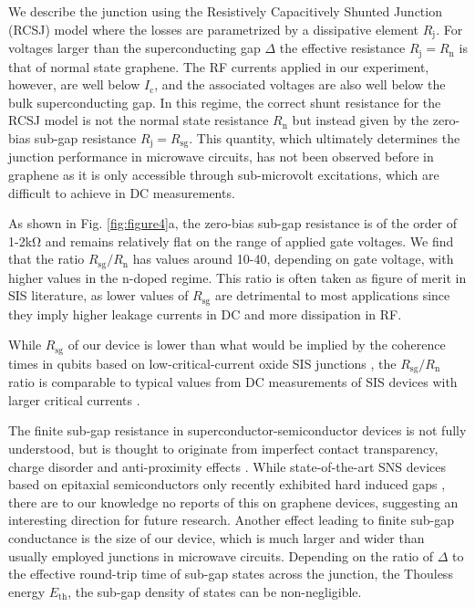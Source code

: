We describe the junction using the Resistively Capacitively Shunted Junction (RCSJ) model where the losses are parametrized by a dissipative element $R_\text{j}$.
For voltages larger than the superconducting gap $\Delta$ the effective resistance $R_\text{j} = R_\text{n}$ is that of normal state graphene.
The RF currents applied in our experiment, however, are well below $I_\text{c}$, and the associated voltages are also well below the bulk superconducting gap.
In this regime, the correct shunt resistance for the RCSJ model is not the normal state resistance $R_\text{n}$ but instead given by the zero-bias sub-gap resistance $R_\text{j} = R_\text{sg}$.
This quantity, which ultimately determines the junction performance in microwave circuits, has not been observed before in graphene as it is only accessible through sub-microvolt excitations, which are difficult to achieve in DC measurements.

As shown in Fig. \ref{fig:figure4}a, the zero-bias sub-gap resistance is of the order of 1-2\si{\kilo\ohm} and remains relatively flat on the range of applied gate voltages.
We find that the ratio $R_\text{sg}/R_\text{n}$ has values around 10-40, depending on gate voltage, with higher values in the n-doped regime.
This ratio is often taken as figure of merit in SIS literature, as lower values of $R_\text{sg}$ are detrimental to most applications since they imply higher leakage currents in DC and more dissipation in RF.

While $R_\text{sg}$ of our device is lower than what would be implied by the coherence times in qubits based on low-critical-current oxide SIS junctions \cite{paik_observation_2011a}, the $R_\text{sg}/R_\text{n}$ ratio is comparable to typical values from DC measurements of SIS devices with larger critical currents \cite{iosad_characterization_2002a,tolpygo_subgap_2013}.

The finite sub-gap resistance in superconductor-semiconductor devices is not fully understood, but is thought to originate from imperfect contact transparency, charge disorder and anti-proximity effects \cite{liu_phenomenology_2017a,bretheau_tunnelling_2017a}.
While state-of-the-art SNS devices based on epitaxial semiconductors only recently exhibited hard induced gaps \cite{chang_hard_2015,kjaergaard_quantized_2016}, there are to our knowledge no reports of this on graphene devices, suggesting an interesting direction for future research.
Another effect leading to finite sub-gap conductance is the size of our device, which is much larger and wider than usually employed junctions in microwave circuits.
Depending on the ratio of $\Delta$ to the effective round-trip time of sub-gap states across the junction, the Thouless energy $E_\text{th}$, the sub-gap density of states can be non-negligible.

